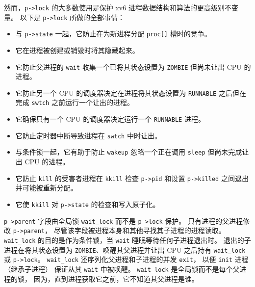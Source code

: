 然而，\lstinline{p->lock} 的大多数使用是保护 xv6 进程数据结构和算法的更高级别不变量。
以下是 \lstinline{p->lock} 所做的全部事情：



\begin{itemize}

\item 与 \lstinline{p->state} 一起，它防止在为新进程分配
  \lstinline{proc[]} 槽时的竞争。

\item 它在进程被创建或销毁时将其隐藏起来。

\item 它防止父进程的 \lstinline{wait} 收集一个已将其状态设置为 \lstinline{ZOMBIE} 但尚未让出 CPU 的进程。

\item 它防止另一个 CPU 的调度器决定在进程将其状态设置为 \lstinline{RUNNABLE} 之后但在完成 \lstinline{swtch} 之前运行一个让出的进程。

\item 它确保只有一个 CPU 的调度器决定运行一个
  \lstinline{RUNNABLE} 进程。

\item 它防止定时器中断导致进程在 \lstinline{swtch} 中时让出。

\item 与条件锁一起，它有助于防止 \lstinline{wakeup}
忽略一个正在调用 \lstinline{sleep} 但尚未完成让出 CPU 的进程。

\item 它防止 \lstinline{kill} 的受害者进程在 \lstinline{kkill} 检查
  \lstinline{p->pid} 和设置 \lstinline{p->killed} 之间退出并可能被重新分配。

\item 它使 \lstinline{kkill} 对 \lstinline{p->state} 的检查和写入原子化。

\end{itemize}


\lstinline{p->parent} 字段由全局锁
\lstinline{wait_lock} 而不是 \lstinline{p->lock} 保护。
只有进程的父进程修改 \lstinline{p->parent}，
尽管该字段被进程本身和其他寻找其子进程的进程读取。
\lstinline{wait_lock} 的目的是作为条件锁，当
\lstinline{wait} 睡眠等待任何子进程退出时。
退出的子进程在将其状态设置为 \lstinline{ZOMBIE}、唤醒其父进程并让出 CPU 之后持有
\lstinline{wait_lock} 或 \lstinline{p->lock}。
\lstinline{wait_lock} 还序列化父进程和子进程的并发
\lstinline{exit}，
以便 \lstinline{init} 进程（继承子进程）
保证从其 \lstinline{wait} 中被唤醒。
\lstinline{wait_lock} 是全局锁而不是每个父进程的锁，
因为，直到进程获取它之前，它不知道其父进程是谁。

